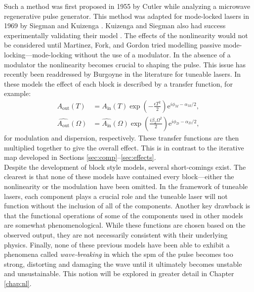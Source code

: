 Such a method was first proposed in 1955 by Cutler \cite{cutler} while analyzing a microwave regenerative pulse generator. This method was adapted for mode-locked lasers in 1969 by Siegman and Kuizenga \cite{kuizenga1970a, siegman}. Kuizenga and Siegman also had success experimentally validating their model \cite{kuizenga1970b, kuizenga1970}. The effects of the nonlinearity would not be considered until Martinez, Fork, and Gordon \cite{martinez1984, martinez1985} tried modelling passive mode-locking---mode-locking without the use of a modulator. In the absence of a modulator the nonlinearity becomes crucial to shaping the pulse. This issue has recently been readdressed by Burgoyne \cite{burgoyne2014} in the literature for tuneable lasers. In these models the effect of each block is described by a transfer function, for example:
\begin{align*}
A_{\text{out}}(T) &= A_{\text{in}}(T) \exp \left( - \frac{\epsilon T^2}{2} \right) \textrm{e}^{i \phi_M - \alpha_M / 2}, \\
\widehat{A_{\text{out}}}(\Omega) &= \widehat{A_{\text{in}}}(\Omega) \exp \left( \frac{i \beta_2 \Omega^2}{2} \right) \textrm{e}^{i \phi_D - \alpha_D / 2},
\end{align*}
for modulation and dispersion, respectively. These transfer functions are then multiplied together to give the overall effect. This is in contrast to the iterative map developed in Sections \ref{sec:comp}--\ref{sec:effects}. \\

Despite the development of block style models, several short-comings exist. The clearest is that none of these models have contained every block---either the nonlinearity or the modulation have been omitted. In the framework of tuneable lasers, each component plays a crucial role and the tuneable laser will not function without the inclusion of all of the components. Another key drawback is that the functional operations of some of the components used in other models are somewhat phenomenological. While these functions are chosen based on the observed output, they are not necessarily consistent with their underlying physics. Finally, none of these previous models have been able to exhibit a phenomena called \emph{wave-breaking} in which the \acrlong{spm} of the pulse becomes too strong, distorting and damaging the wave until it ultimately becomes unstable and unsustainable. This notion will be explored in greater detail in Chapter \ref{chap:nl}. \\
